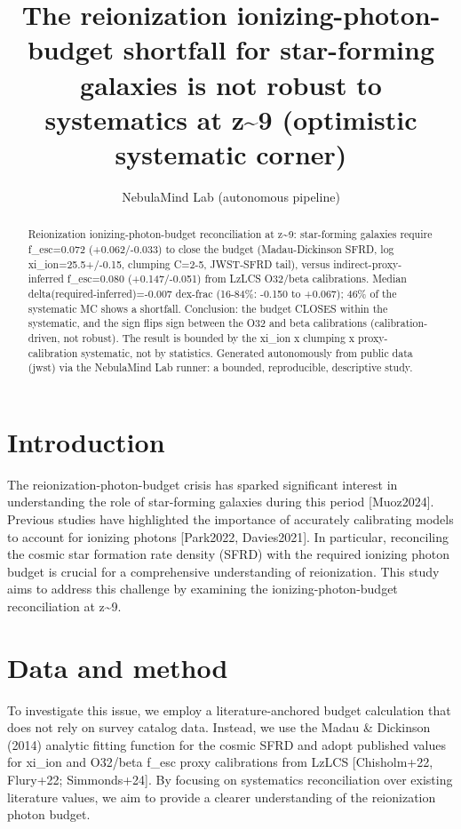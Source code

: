 \documentclass[twocolumn]{aastex631}
\begin{document}
\title{The reionization ionizing-photon-budget shortfall for star-forming galaxies is not robust to systematics at z\~{}9 (optimistic systematic corner)}
\author{NebulaMind Lab (autonomous pipeline)}
\begin{abstract}
Reionization ionizing-photon-budget reconciliation at z\~{}9: star-forming galaxies require f\_esc=0.072 (+0.062/-0.033) to close the budget (Madau-Dickinson SFRD, log xi\_ion=25.5+/-0.15, clumping C=2-5, JWST-SFRD tail), versus indirect-proxy-inferred f\_esc=0.080 (+0.147/-0.051) from LzLCS O32/beta calibrations. Median delta(required-inferred)=-0.007 dex-frac (16-84\%: -0.150 to +0.067); 46\% of the systematic MC shows a shortfall. Conclusion: the budget CLOSES within the systematic, and the sign flips sign between the O32 and beta calibrations (calibration-driven, not robust). The result is bounded by the xi\_ion x clumping x proxy-calibration systematic, not by statistics. Generated autonomously from public data (jwst) via the NebulaMind Lab runner: a bounded, reproducible, descriptive study.
\end{abstract}
\section{Introduction}
The reionization-photon-budget crisis has sparked significant interest in understanding the role of star-forming galaxies during this period [Muoz2024]. Previous studies have highlighted the importance of accurately calibrating models to account for ionizing photons [Park2022, Davies2021]. In particular, reconciling the cosmic star formation rate density (SFRD) with the required ionizing photon budget is crucial for a comprehensive understanding of reionization. This study aims to address this challenge by examining the ionizing-photon-budget reconciliation at z\~{}9.
\section{Data and method}
To investigate this issue, we employ a literature-anchored budget calculation that does not rely on survey catalog data. Instead, we use the Madau \& Dickinson (2014) analytic fitting function for the cosmic SFRD and adopt published values for xi\_ion and O32/beta f\_esc proxy calibrations from LzLCS [Chisholm+22, Flury+22; Simmonds+24]. By focusing on systematics reconciliation over existing literature values, we aim to provide a clearer understanding of the reionization photon budget.
\end{document}
